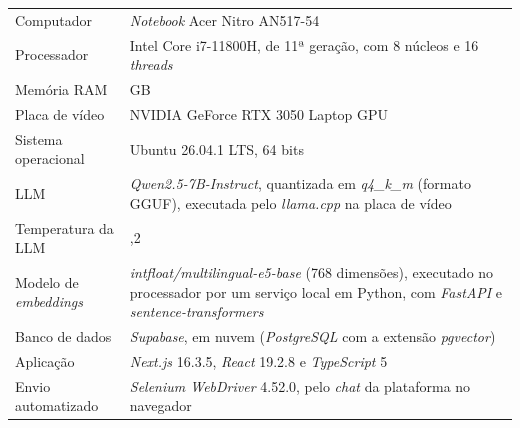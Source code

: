 \begin{quadro}[H]\captionsetup{name=Quadro}
\centering
\caption{Configuração do ambiente experimental}
\label{quad:configuracao-ambiente-experimental}

\renewcommand{\arraystretch}{1.3}
\setlength{\tabcolsep}{4pt}

\begin{tabularx}{\textwidth}{
|>{\raggedright\arraybackslash}p{3.5cm}
|>{\raggedright\arraybackslash}X|
}
\hline

\rowcolor[HTML]{C0C0C0}
\multicolumn{1}{|c|}{\textbf{Item}} &
\multicolumn{1}{c|}{\textbf{Configuração}} \\ \hline

Computador &
\textit{Notebook} Acer Nitro AN517-54 \\ \hline

Processador &
Intel Core i7-11800H, de 11ª geração, com 8 núcleos e 16 \textit{threads} \\ \hline

Memória RAM &
64 GB \\ \hline

Placa de vídeo &
NVIDIA GeForce RTX 3050 Laptop GPU \\ \hline

Sistema operacional &
Ubuntu 26.04.1 LTS, 64 bits \\ \hline

LLM &
\textit{Qwen2.5-7B-Instruct}, quantizada em \textit{q4\_k\_m} (formato GGUF), executada pelo \textit{llama.cpp} na placa de vídeo \\ \hline

Temperatura da LLM &
0,2 \\ \hline

Modelo de \textit{embeddings} &
\textit{intfloat/multilingual-e5-base} (768 dimensões), executado no processador por um serviço local em Python, com \textit{FastAPI} e \textit{sentence-transformers} \\ \hline

Banco de dados &
\textit{Supabase}, em nuvem (\textit{PostgreSQL} com a extensão \textit{pgvector}) \\ \hline

Aplicação &
\textit{Next.js} 16.3.5, \textit{React} 19.2.8 e \textit{TypeScript} 5 \\ \hline

Envio automatizado &
\textit{Selenium WebDriver} 4.52.0, pelo \textit{chat} da plataforma no navegador \\ \hline

\end{tabularx}

{\fontsize{10pt}{12pt}\selectfont
\caption*{Fonte: Elaborado pela autora (2026).} %
}
\end{quadro}

